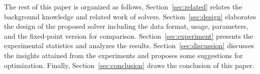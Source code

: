 The rest of this paper is organized as follows, Section~\ref{sec:related} relates the background knowledge and related work of \SA solvers. Section~\ref{sec:design} elaborates the design of the proposed \SA solver including the data format, usage, parameters, and the fixed-point version for comparison. Section~\ref{sec:experiment} presents the experimental statistics and analyzes the results. Section~\ref{sec:discussion} discusses the insights attained from the experiments and proposes some suggestions for optimization. Finally, Section~\ref{sec:conclusion} draws the conclusion of this paper. 